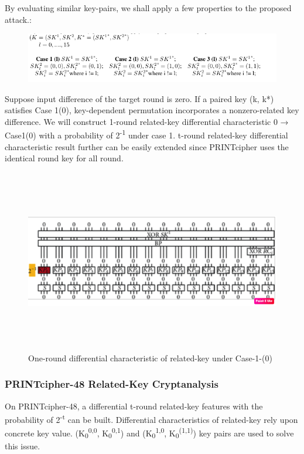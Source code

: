 \documentclass[journal=tosc,preprint]{iacrtrans}
\begin{document}
By evaluating similar key-pairs, we shall apply a few properties to the proposed attack.: \newline
\begin{figure}[ht]
	\includegraphics{pics/2.png}
\end{figure}


Suppose input difference of the target round is zero. If a paired key (k, k*) 
satisfies Case 1(0), key-dependent permutation incorporates a nonzero-related key difference. We will construct 1-round related-key differential characteristic 0 → Case1(0) with a probability of 2\textsuperscript{-1} under case 1. t-round related-key differential characteristic result further can be easily extended since PRINTcipher uses the identical round key for all round.

\begin{figure}[ht]
	\centering
	\includegraphics[height=8cm, width=12cm]{pics/oneround.png}
	\caption{One-round differential characteristic of related-key under Case-1-(0)}
\end{figure}


\newpage
\subsubsection{PRINTcipher-48 Related-Key Cryptanalysis}
On PRINTcipher-48, a differential t-round related-key features with the probability of 2\textsuperscript{-t} can be built. Differential characteristics of related-key rely upon concrete key value. (K\textsubscript{0}\textsuperscript{0,0}, K\textsubscript{0}\textsuperscript{0,1}) and (K\textsubscript{0}\textsuperscript{1,0}, K\textsubscript{0}\textsuperscript{(1,1)}) key pairs are used to solve this issue.
\end{document}
